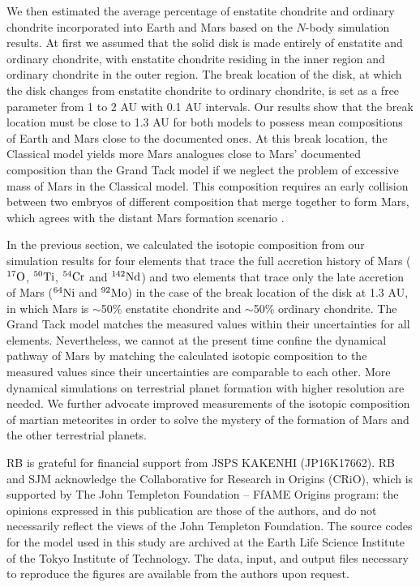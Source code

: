 \documentclass{aa}
\begin{document}
We then estimated the average percentage of enstatite chondrite and ordinary chondrite incorporated into Earth and Mars based on the $N$-body simulation results. At first we assumed that the solid disk is made entirely of enstatite and ordinary chondrite, with enstatite chondrite residing in the inner region and ordinary chondrite in the outer region. The break location of the disk, at which the disk changes from enstatite chondrite to ordinary chondrite, is set as a free parameter from 1 to 2 AU with 0.1 AU intervals. Our results show that the break location must be close to 1.3 AU for both models to possess mean compositions of Earth and Mars close to the documented ones. At this break location, the Classical model yields more Mars analogues close to Mars' documented composition than the Grand Tack model if we neglect the problem of excessive mass of Mars in the Classical model. This composition requires an early collision between two embryos of different composition that merge together to form Mars, which agrees with the distant Mars formation scenario \citep{brasser2017cool}.

In the previous section, we calculated the isotopic composition from our simulation results for four elements that trace the full accretion history of Mars ($^{17} \rm O$, $^{50} \rm Ti$, $^{54} \rm Cr$ and $^{142} \rm Nd$) and two elements that trace only the late accretion of Mars ($^{64} \rm Ni$ and $^{92} \rm Mo$) in the case of the break location of the disk at 1.3 AU, in which Mars is $\sim$50\% enstatite chondrite and $\sim$50\% ordinary chondrite. The Grand Tack model matches the measured values within their uncertainties for all elements. Nevertheless, we cannot at the present time confine the dynamical pathway of Mars by matching the calculated isotopic composition to the measured values since their uncertainties are comparable to each other. More dynamical simulations on terrestrial planet formation with higher resolution are needed. We further advocate improved measurements of the isotopic composition of martian meteorites in order to solve the mystery of the formation of Mars and the other terrestrial planets.

\begin{acknowledgements}
RB is grateful for financial support from JSPS KAKENHI (JP16K17662). RB and SJM acknowledge the Collaborative for Research in Origins (CRiO), which is supported by The John Templeton Foundation – FfAME Origins program: the opinions expressed in this publication are those of the authors, and do not necessarily reflect the views of the John Templeton Foundation. The source codes for the model used in this study are archived at the Earth Life Science Institute of the Tokyo Institute of Technology. The data, input, and output files necessary to reproduce the figures are available from the authors upon request.
\end{acknowledgements}


 


 
\end{document}
